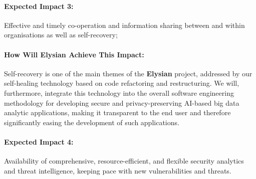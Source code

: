 \documentclass[a4paper,11pt]{article}
\newcommand{\project}[1]{\textbf{#1}\xspace}
\newcommand{\SECURITY}{\project{Elysian}}
\newcommand{\TheProject}{\SECURITY}
\begin{document}
\begin{mdframed}[backgroundcolor=blue!5]
\paragraph{Expected Impact 3:}
Effective and timely co-operation and information sharing between and within organisations as well as self-recovery;
\end{mdframed}

\begin{mdframed}[backgroundcolor=gray!10]
\paragraph{How Will \TheProject{} Achieve This Impact:}
Self-recovery is one of the main themes of the \TheProject{} project, addressed by our self-healing technology based on code refactoring and restructuring. We will, furthermore, integrate this technology into the overall software engineering methodology for developing secure and privacy-preserving AI-based big data analytic applications, making it transparent to the end user and therefore significantly easing the development of such applications. 
\end{mdframed}

\begin{mdframed}[backgroundcolor=blue!5]
\paragraph{Expected Impact 4:}
Availability of comprehensive, resource-efficient, and flexible security analytics and threat intelligence, keeping pace with new vulnerabilities and threats.
\end{mdframed}
\end{document}
